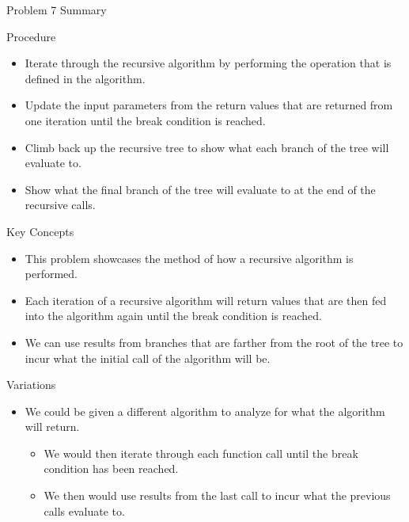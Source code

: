 \begin{summary}{Problem 7 Summary}
    \begin{statement}{Procedure}
        \begin{itemize}
            \item Iterate through the recursive algorithm by performing the operation that is defined in the algorithm.
            \item Update the input parameters from the return values that are returned from one iteration until the break condition is reached.
            \item Climb back up the recursive tree to show what each branch of the tree will evaluate to.
            \item Show what the final branch of the tree will evaluate to at the end of the recursive calls.
        \end{itemize}
    \end{statement}
    \begin{statement}{Key Concepts}
        \begin{itemize}
            \item This problem showcases the method of how a recursive algorithm is performed.
            \item Each iteration of a recursive algorithm will return values that are then fed into the algorithm again until the break condition is reached.
            \item We can use results from branches that are farther from the root of the tree to incur what the initial call of the algorithm will be.
        \end{itemize}
    \end{statement}
    \begin{statement}{Variations}
        \begin{itemize}
            \item We could be given a different algorithm to analyze for what the algorithm will return.
            \begin{itemize}
                \item We would then iterate through each function call until the break condition has been reached.
                \item We then would use results from the last call to incur what the previous calls evaluate to.
            \end{itemize}
        \end{itemize}
    \end{statement}
\end{summary}
